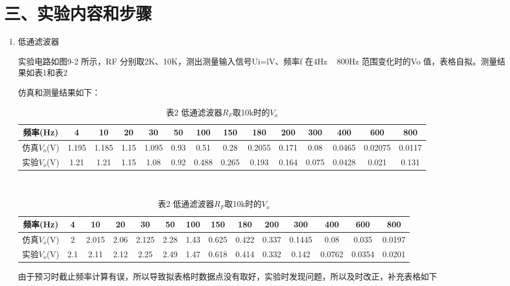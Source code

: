 \documentclass[a4paper,10pt,notitlepage]{article}
\begin{document}
\section*{三、实验内容和步骤}
\begin{enumerate}
	\item 低通滤波器\par 
	实验电路如图9-2 所示，RF 分别取2K、10K，测出测量输入信号Ui=lV、频率f 在4Hz
	~ 800Hz 范围变化时的Vo 值，表格自拟。测量结果如表1和表2\par
	仿真和测量结果如下：
	\begin{table}[h]
		\begin{minipage}{0.3\textwidth}
			\centering
			\begin{tabular}{|c|c|c|c|c|c|c|c|c|c|c|c|c|c|}
				\hline
				频率(Hz) & 4 & 10 & 20 & 30 & 50 & 100 & 150 & 180 & 200 & 300 & 400 & 600 & 800 \\
				\hline
				仿真$V_o$(V) & 1.195 & 1.185 & 1.15 & 1.095 & 0.93 & 0.51 & 0.28 & 0.2055 & 0.171 & 0.08 & 0.0465 & 0.02075 & 0.0117 \\
				\hline 
				实验$V_o$(V) & 1.21 & 1.21 & 1.15 & 1.08 & 0.92 & 0.488 & 0.265 & 0.193 & 0.164 & 0.075 & 0.0428 & 0.021 & 0.131 \\
				\hline
			\end{tabular}
			\caption*{表1 低通滤波器$R_F$取2k时的$V_o$}
		\end{minipage}
		\\
		\begin{minipage}{0.3\textwidth}
			\centering
			\begin{tabular}{|c|c|c|c|c|c|c|c|c|c|c|c|c|c|}
				\hline
				频率(Hz) & 4 & 10 & 20 & 30 & 50 & 100 & 150 & 180 & 200 & 300 & 400 & 600 & 800 \\
				\hline
				仿真$V_o$(V) & 2 & 2.015 & 2.06 & 2.125 & 2.28 & 1.43 & 0.625 & 0.422 & 0.337 & 0.1445 & 0.08 & 0.035 & 0.0197 \\
				\hline 
				实验$V_o$(V) & 2.1 & 2.11 & 2.12 &  2.25 & 2.49 & 1.47 & 0.618 & 0.414 & 0.332 & 0.142 & 0.0762 & 0.0354 & 0.0201 \\
				\hline
			\end{tabular}
			\caption*{表2 低通滤波器$R_F$取10k时的$V_o$}
		\end{minipage}
	\end{table}
	由于预习时截止频率计算有误，所以导致拟表格时数据点没有取好，实验时发现问题，所以及时改正，补充表格如下\par 
	\begin{table}[h]
		\begin{minipage}{0.3\textwidth}

\end{minipage}
\end{table}
\end{enumerate}
\end{document}
